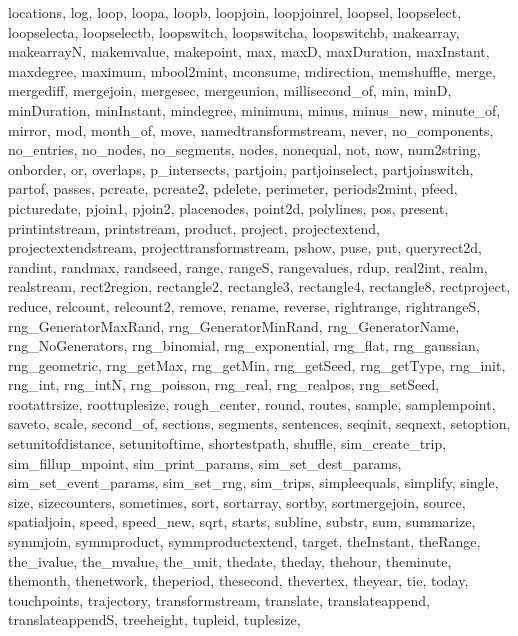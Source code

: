 {{        locations, log, loop, loopa, loopb, loopjoin, loopjoinrel, loopsel, loopselect, loopselecta, 
        loopselectb, loopswitch, loopswitcha, loopswitchb, makearray, makearrayN, makemvalue, makepoint, 
        max, maxD, maxDuration, maxInstant, maxdegree, maximum, mbool2mint, mconsume, mdirection, 
        memshuffle, merge, mergediff, mergejoin, mergesec, mergeunion, millisecond\_of, min, minD, 
        minDuration, minInstant, mindegree, minimum, minus, minus\_new, minute\_of, mirror, mod, 
        month\_of, move, namedtransformstream, never, no\_components, no\_entries, no\_nodes, 
        no\_segments, nodes, nonequal, not, now, num2string, onborder, or, overlaps, p\_intersects, 
        partjoin, partjoinselect, partjoinswitch, partof, passes, pcreate, pcreate2, pdelete, 
        perimeter, periods2mint, pfeed, picturedate, pjoin1, pjoin2, placenodes, point2d, polylines, 
        pos, present, printintstream, printstream, product, project, projectextend, projectextendstream, 
        projecttransformstream, pshow, puse, put, queryrect2d, randint, randmax, randseed, range, 
        rangeS, rangevalues, rdup, real2int, realm, realstream, rect2region, rectangle2, rectangle3, 
        rectangle4, rectangle8, rectproject, reduce, relcount, relcount2, remove, rename, reverse, 
        rightrange, rightrangeS, rng\_GeneratorMaxRand, rng\_GeneratorMinRand, rng\_GeneratorName, 
        rng\_NoGenerators, rng\_binomial, rng\_exponential, rng\_flat, rng\_gaussian, rng\_geometric, 
        rng\_getMax, rng\_getMin, rng\_getSeed, rng\_getType, rng\_init, rng\_int, rng\_intN, 
        rng\_poisson, rng\_real, rng\_realpos, rng\_setSeed, rootattrsize, roottuplesize, 
        rough\_center, round, routes, sample, samplempoint, saveto, scale, second\_of, sections, 
        segments, sentences, seqinit, seqnext, setoption, setunitofdistance, setunitoftime, 
        shortestpath, shuffle, sim\_create\_trip, sim\_fillup\_mpoint, sim\_print\_params, 
        sim\_set\_dest\_params, sim\_set\_event\_params, sim\_set\_rng, sim\_trips, simpleequals, 
        simplify, single, size, sizecounters, sometimes, sort, sortarray, sortby, sortmergejoin, 
        source, spatialjoin, speed, speed\_new, sqrt, starts, subline, substr, sum, summarize, 
        symmjoin, symmproduct, symmproductextend, target, theInstant, theRange, the\_ivalue, 
        the\_mvalue, the\_unit, thedate, theday, thehour, theminute, themonth, thenetwork, theperiod, 
        thesecond, thevertex, theyear, tie, today, touchpoints, trajectory, transformstream, 
        translate, translateappend, translateappendS, treeheight, tupleid, tuplesize, 
}}
